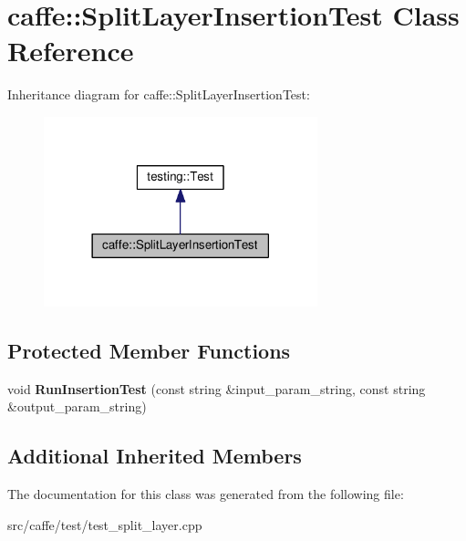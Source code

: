 \hypertarget{classcaffe_1_1_split_layer_insertion_test}{}\section{caffe\+:\+:Split\+Layer\+Insertion\+Test Class Reference}
\label{classcaffe_1_1_split_layer_insertion_test}


Inheritance diagram for caffe\+:\+:Split\+Layer\+Insertion\+Test\+:
\nopagebreak
\begin{figure}[H]
\begin{center}
\leavevmode
\includegraphics[width=225pt]{classcaffe_1_1_split_layer_insertion_test__inherit__graph}
\end{center}
\end{figure}
\subsection*{Protected Member Functions}
\begin{DoxyCompactItemize}
\item 
\mbox{\label{classcaffe_1_1_split_layer_insertion_test_a47483f267814bf44946be6ec09544ccd}} 
void {\bfseries Run\+Insertion\+Test} (const string \&input\+\_\+param\+\_\+string, const string \&output\+\_\+param\+\_\+string)
\end{DoxyCompactItemize}
\subsection*{Additional Inherited Members}


The documentation for this class was generated from the following file\+:\begin{DoxyCompactItemize}
\item 
src/caffe/test/test\+\_\+split\+\_\+layer.\+cpp\end{DoxyCompactItemize}

